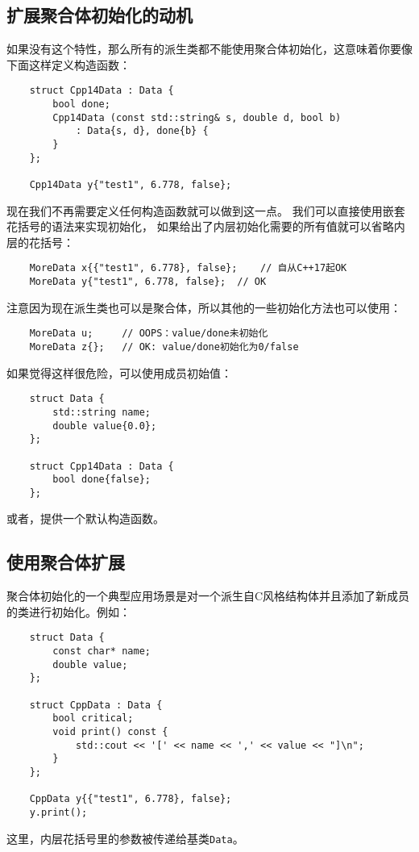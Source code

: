 \subsection{扩展聚合体初始化的动机}
如果没有这个特性，那么所有的派生类都不能使用聚合体初始化，这意味着你要像下面这样定义构造函数：
\begin{lstlisting}
    struct Cpp14Data : Data {
        bool done;
        Cpp14Data (const std::string& s, double d, bool b)
            : Data{s, d}, done{b} {
        }
    };

    Cpp14Data y{"test1", 6.778, false};
\end{lstlisting}
现在我们不再需要定义任何构造函数就可以做到这一点。
我们可以直接使用嵌套花括号的语法来实现初始化，
如果给出了内层初始化需要的所有值就可以省略内层的花括号：
\begin{lstlisting}
    MoreData x{{"test1", 6.778}, false};    // 自从C++17起OK
    MoreData y{"test1", 6.778, false};  // OK
\end{lstlisting}
注意因为现在派生类也可以是聚合体，所以其他的一些初始化方法也可以使用：
\begin{lstlisting}
    MoreData u;     // OOPS：value/done未初始化
    MoreData z{};   // OK: value/done初始化为0/false
\end{lstlisting}
如果觉得这样很危险，可以使用成员初始值：
\begin{lstlisting}
    struct Data {
        std::string name;
        double value{0.0};
    };

    struct Cpp14Data : Data {
        bool done{false};
    };
\end{lstlisting}
或者，提供一个默认构造函数。

\subsection{使用聚合体扩展}
聚合体初始化的一个典型应用场景是对一个派生自C风格结构体并且添加了新成员的类进行初始化。例如：
\begin{lstlisting}
    struct Data {
        const char* name;
        double value;
    };

    struct CppData : Data {
        bool critical;
        void print() const {
            std::cout << '[' << name << ',' << value << "]\n";
        }
    };

    CppData y{{"test1", 6.778}, false};
    y.print();
\end{lstlisting}
这里，内层花括号里的参数被传递给基类\texttt{Data}。

